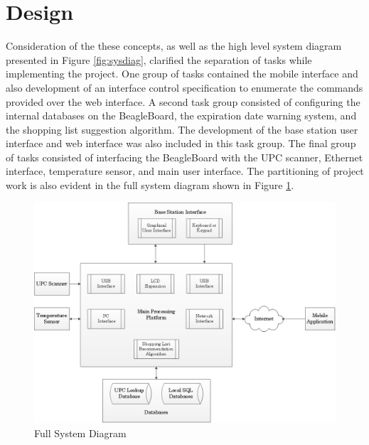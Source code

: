 \documentclass[11pt]{article} %
\begin{document}
\section{Design}
Consideration of the these concepts, as well as the high level system diagram presented in Figure \ref{fig:sysdiag}, clarified the separation of tasks while implementing the project. One group of tasks contained the mobile interface and also development of an interface control specification to enumerate the commands provided over the web interface. A second task group consisted of configuring the internal databases on the BeagleBoard, the expiration date warning system, and the shopping list suggestion algorithm. The development of the base station user interface and web interface was also included in this task group. The final group of tasks consisted of interfacing the BeagleBoard with the UPC scanner, Ethernet interface, temperature sensor, and main user interface. The partitioning of project work is also evident in the full system diagram shown in Figure \ref{fig:fullsys}.
\begin{figure}[h!]
\vspace{0.5cm}
\begin{center}
\includegraphics[scale=0.4]{../Graphics/FullSystemDiagram}
\caption{Full System Diagram}
\label{fig:fullsys}
\end{center}
\end{figure}
\newline \quad \newline
\end{document}
